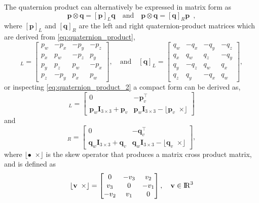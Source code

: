 \documentclass{article}
\newcommand{\real}{{\rm I\!R}}
\renewcommand{\Vec}[1]{{\mathbf{#1}}}
\newcommand{\I}{{\Vec{I}}}
\newcommand{\Skew}[1]{{\lfloor #1 \enspace \times \rfloor}}
\newcommand{\Transpose}[1]{{{#1^{\top}}}}
\begin{document}
The quaternion product can alternatively be expressed in matrix form as
%
\begin{equation}
  \Vec{p} \otimes \Vec{q} = [\Vec{p}]_{L} \Vec{q}
  \quad \text{and} \quad
  \Vec{p} \otimes \Vec{q} = [\Vec{q}]_{R} \Vec{p} \enspace ,
\end{equation}
%
where $[\Vec{p}]_{L}$ and $[\Vec{q}]_{R}$ are the left and right
quaternion-product matrices which are derived from
\eqref{eq:quaternion_product},
%
\begin{equation}
  [\Vec{p}]_{L} =
  \begin{bmatrix}
    p_w & -p_x & -p_y & -p_z \\
    p_x & p_w & -p_z & p_y \\
    p_y & p_z & p_w & -p_x \\
    p_z & -p_y & p_x & p_w
  \end{bmatrix},
  \quad \text{and} \quad
  [\Vec{q}]_{L} =
  \begin{bmatrix}
    q_w & -q_x & -q_y & -q_z \\
    q_x & q_w & q_z & -q_y \\
    q_y & -q_z & q_w & q_x \\
    q_z & q_y & -q_x & q_w
  \end{bmatrix},
\end{equation}
%
or inspecting \eqref{eq:quaternion_product_2} a compact form can be derived as,
%
\begin{equation}
  [\Vec{p}]_{L} =
  \begin{bmatrix}
    0 & -\Transpose{\Vec{p}_{v}} \\
    \Vec{p}_w \I_{3 \times 3} + \Vec{p}_{v} &
    \Vec{p}_w \I_{3 \times 3} -\Skew{\Vec{p}_{v}}
  \end{bmatrix}
\end{equation}
%
and
%
\begin{equation}
  [\Vec{q}]_{R} =
  \begin{bmatrix}
    0 & -\Transpose{\Vec{q}_{v}} \\
    \Vec{q}_w \I_{3 \times 3} + \Vec{q}_{v} &
    \Vec{q}_w \I_{3 \times 3} -\Skew{\Vec{q}_{v}}
  \end{bmatrix},
\end{equation}
%
where $\Skew{\bullet}$ is the skew operator that produces a matrix cross
product matrix, and is defined as
%
\begin{equation}
  \Skew{\Vec{v}} =
  \begin{bmatrix}
    0 & -v_{3} & v_{2} \\
    v_{3} & 0 & -v_{1} \\
    -v_{2} & v_{1} & 0
  \end{bmatrix},
  \quad
  \Vec{v} \in \real^{3}
\end{equation}
%
\end{document}
